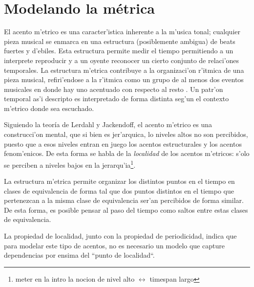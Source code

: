 \section{Modelando la m\'etrica}
 \newline
El acento m'etrico es una caracter'istica inherente a la m'usica tonal; cualquier pieza musical se enmarca en una estructura 
(posiblemente ambigua) de beats fuertes y d'ebiles. Esta estructura permite medir el tiempo permitiendo a un interprete reproducir y a un oyente
reconocer un cierto conjunto de relaci'ones temporales. La estructura m'etrica contribuye a la organizaci'on r'itmica de una pieza musical, 
refiri'endose a la r'itmica como un grupo de al menos dos eventos musicales en donde hay uno acentuado con respecto al resto \cite{CooperMeyer60}.
Un patr'on temporal as'i descripto es interpretado de forma distinta seg'un el contexto m'etrico donde sea escuchado. 

 \newline
Siguiendo la teor\'ia de Lerdahl y Jackendoff, el acento m'etrico es una construcci'on mental, que si bien es jer'arquica, lo niveles altos no son percibidos, puesto
que a esos niveles entran en juego los acentos estructurales y los acentos fenom'enicos. De esta forma se habla de la \emph{localidad} de los acentos m'etricos: s'olo se perciben a 
niveles bajos en la jerarqu'ia\footnote{meter en la intro la nocion de nivel alto $\leftrightarrow$ timespan largo}. 



 \newline
La estructura m'etrica permite organizar los distintos puntos en el tiempo en clases de 
equivalencia de forma tal que dos puntos distintos en el tiempo que pertenezcan a la misma clase de equivalencia ser'an percibidos de forma similar\cite{Benjamin84}. 
De esta forma, es posible pensar al paso del tiempo como saltos entre estas clases de equivalencia. 

La propiedad de localidad, junto con la propiedad de periodicidad, indica que para modelar este tipo de acentos, no es necesario un modelo que capture dependencias 
por ensima del ``punto de localidad``. 


